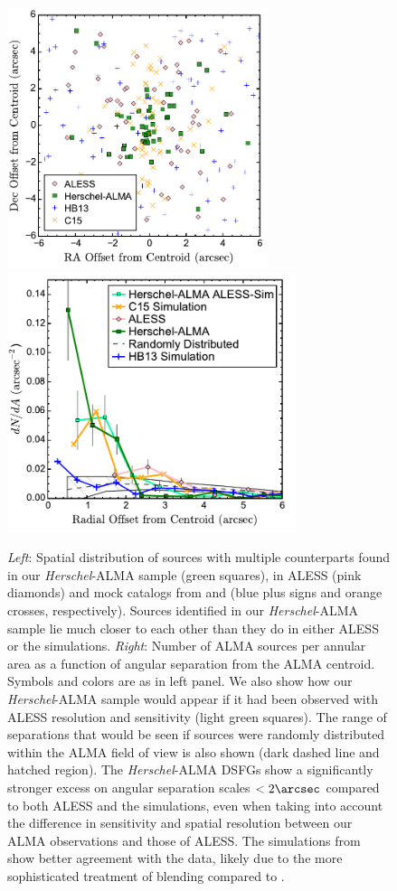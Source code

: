 \documentclass[iop]{emulateapj}
\begin{document}
\begin{figure}[!tbp] 
\includegraphics[height=3in]{AllPositions.pdf}
\includegraphics[height=3in]{dNdA.pdf}

\caption{ {\it Left}: Spatial distribution of sources with multiple
counterparts found in our {\it Herschel}-ALMA sample (green squares), in ALESS
(pink diamonds) and mock catalogs from \citet{HB13} and \citet{Cowley:2015lr}
(blue plus signs and orange crosses, respectively).  Sources identified in our
{\it Herschel}-ALMA sample lie much closer to each other than they do in either
ALESS or the \citet{HB13} simulations.  {\it Right}: Number of ALMA sources per
annular area as a function of angular separation from the ALMA centroid.
Symbols and colors are as in left panel.  We also show how our {\it
Herschel}-ALMA sample would appear if it had been observed with ALESS
resolution and sensitivity (light green squares).  The range of separations
that would be seen if sources were randomly distributed within the ALMA field
of view is also shown (dark dashed line and hatched region).  The {\it
Herschel}-ALMA DSFGs show a significantly stronger excess on angular separation
scales $<2\arcsec$ compared to both ALESS and the \citet{HB13} simulations,
even when taking into account the difference in sensitivity and spatial
resolution between our ALMA observations and those of ALESS.  The simulations
from \citet{Cowley:2015lr} show better agreement with the data, likely due to
the more sophisticated treatment of blending compared to \citet{HB13}.}
\label{fig:dNdA}

\end{figure}
\end{document}
